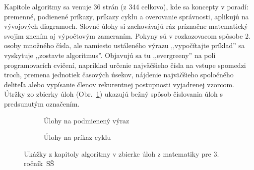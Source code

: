 Kapitole algoritmy sa venuje 36 strán (z 344 celkovo), kde sa koncepty v poradí: premenné, podienené príkazy, príkazy cyklu a overovanie správnosti, aplikujú na vývojových diagramoch. Slovné úlohy si zachovávajú ráz príznačne matematický svojim znením  aj výpočtovým zameraním. Pokyny sú v rozkazovacom spôsobe 2. osoby množného čísla, ale namiesto ustáleného výrazu ,,vypočítajte príklad'' sa vyskytuje ,,zostavte algoritmus''. Objavujú sa tu ,,evergreeny'' na poli programovacích cvičení, napríklad určenie najväčšieho čísla na vstupe spomedzi troch, premena jednotiek časových úsekov, nájdenie najväčšieho spoločného deliteľa alebo vypísanie členov rekurentnej postupnosti vyjadrenej vzorcom. Útržky zo zbierky úloh (Obr.~\ref{fig:matematika-slovne-ulohy}) ukazujú bežný spôsob číslovania úloh s predsunutým označením.

\begin{figure}[h]
\centering
\begin{subfigure}[b]{0.48\textwidth}
\centering
{}
\caption{Úlohy na podmienený výraz}
\end{subfigure}
\hfill
\begin{subfigure}[b]{0.48\textwidth}
\centering
{}
\caption{Úlohy na príkaz cyklu}
\end{subfigure}
\caption{Ukážky z kapitoly algoritmy v zbierke úloh z matematiky pre 3. ročník~SŠ}
\label{fig:matematika-slovne-ulohy}
\end{figure}

